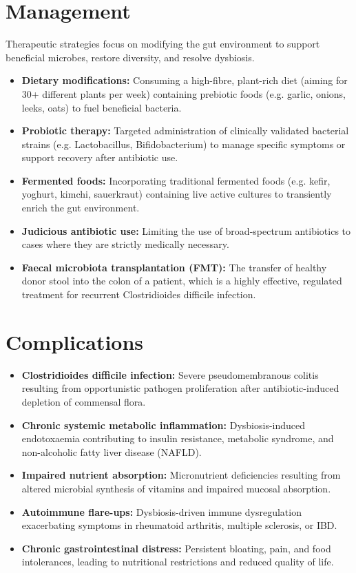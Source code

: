 \section*{Management}
Therapeutic strategies focus on modifying the gut environment to support beneficial microbes, restore diversity, and resolve dysbiosis.
\begin{itemize}
    \item \textbf{Dietary modifications:} Consuming a high-fibre, plant-rich diet (aiming for 30+ different plants per week) containing prebiotic foods (e.g. garlic, onions, leeks, oats) to fuel beneficial bacteria.
    \item \textbf{Probiotic therapy:} Targeted administration of clinically validated bacterial strains (e.g. Lactobacillus, Bifidobacterium) to manage specific symptoms or support recovery after antibiotic use.
    \item \textbf{Fermented foods:} Incorporating traditional fermented foods (e.g. kefir, yoghurt, kimchi, sauerkraut) containing live active cultures to transiently enrich the gut environment.
    \item \textbf{Judicious antibiotic use:} Limiting the use of broad-spectrum antibiotics to cases where they are strictly medically necessary.
    \item \textbf{Faecal microbiota transplantation (FMT):} The transfer of healthy donor stool into the colon of a patient, which is a highly effective, regulated treatment for recurrent Clostridioides difficile infection.
\end{itemize}

\section*{Complications}
\begin{itemize}
    \item \textbf{Clostridioides difficile infection:} Severe pseudomembranous colitis resulting from opportunistic pathogen proliferation after antibiotic-induced depletion of commensal flora.
    \item \textbf{Chronic systemic metabolic inflammation:} Dysbiosis-induced endotoxaemia contributing to insulin resistance, metabolic syndrome, and non-alcoholic fatty liver disease (NAFLD).
    \item \textbf{Impaired nutrient absorption:} Micronutrient deficiencies resulting from altered microbial synthesis of vitamins and impaired mucosal absorption.
    \item \textbf{Autoimmune flare-ups:} Dysbiosis-driven immune dysregulation exacerbating symptoms in rheumatoid arthritis, multiple sclerosis, or IBD.
    \item \textbf{Chronic gastrointestinal distress:} Persistent bloating, pain, and food intolerances, leading to nutritional restrictions and reduced quality of life.
\end{itemize}

